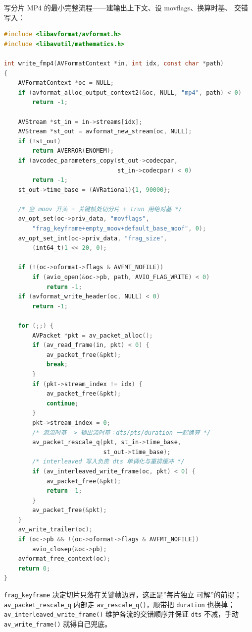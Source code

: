 \documentclass[12pt,a4paper,fontset=fandol]{ctexbook}
\newcommand{\Fn}[1]{\texttt{#1()}}
\newcommand{\Tp}[1]{\texttt{#1}}
\newcommand{\Bk}{\discretionary{}{}{}}
\begin{document}
写分片 MP4 的最小完整流程——建输出上下文、设 movflags、换算时基、
交错写入：

\begin{lstlisting}[style=cstyle,language=C,
  caption={\#avformat 写出分片 MP4（含时间基换算）},
  label={lst:ch10-fmp4}]
#include <libavformat/avformat.h>
#include <libavutil/mathematics.h>

int write_fmp4(AVFormatContext *in, int idx, const char *path)
{
    AVFormatContext *oc = NULL;
    if (avformat_alloc_output_context2(&oc, NULL, "mp4", path) < 0)
        return -1;

    AVStream *st_in = in->streams[idx];
    AVStream *st_out = avformat_new_stream(oc, NULL);
    if (!st_out)
        return AVERROR(ENOMEM);
    if (avcodec_parameters_copy(st_out->codecpar,
                                st_in->codecpar) < 0)
        return -1;
    st_out->time_base = (AVRational){1, 90000};

    /* 空 moov 开头 + 关键帧处切分片 + trun 用绝对基 */
    av_opt_set(oc->priv_data, "movflags",
        "frag_keyframe+empty_moov+default_base_moof", 0);
    av_opt_set_int(oc->priv_data, "frag_size",
        (int64_t)1 << 20, 0);

    if (!(oc->oformat->flags & AVFMT_NOFILE))
        if (avio_open(&oc->pb, path, AVIO_FLAG_WRITE) < 0)
            return -1;
    if (avformat_write_header(oc, NULL) < 0)
        return -1;

    for (;;) {
        AVPacket *pkt = av_packet_alloc();
        if (av_read_frame(in, pkt) < 0) {
            av_packet_free(&pkt);
            break;
        }
        if (pkt->stream_index != idx) {
            av_packet_free(&pkt);
            continue;
        }
        pkt->stream_index = 0;
        /* 源流时基 -> 输出流时基：dts/pts/duration 一起换算 */
        av_packet_rescale_q(pkt, st_in->time_base,
                            st_out->time_base);
        /* interleaved 写入负责 dts 单调化与重排缓冲 */
        if (av_interleaved_write_frame(oc, pkt) < 0) {
            av_packet_free(&pkt);
            return -1;
        }
        av_packet_free(&pkt);
    }
    av_write_trailer(oc);
    if (oc->pb && !(oc->oformat->flags & AVFMT_NOFILE))
        avio_closep(&oc->pb);
    avformat_free_context(oc);
    return 0;
}
\end{lstlisting}

\Tp{frag\_{\Bk}keyframe} 决定切片只落在关键帧边界，这正是''每片独立
可解''的前提；\Tp{av\_{\Bk}packet\_{\Bk}rescale\_{\Bk}q} 内部走
\Fn{av\_{\Bk}rescale\_{\Bk}q}，顺带把 \Tp{duration} 也换掉；
\Fn{av\_{\Bk}interleaved\_{\Bk}write\_{\Bk}frame} 维护各流的交错顺序并保证
\Tp{dts} 不减，手动 \Fn{av\_{\Bk}write\_{\Bk}frame} 就得自己兜底。
\end{document}
